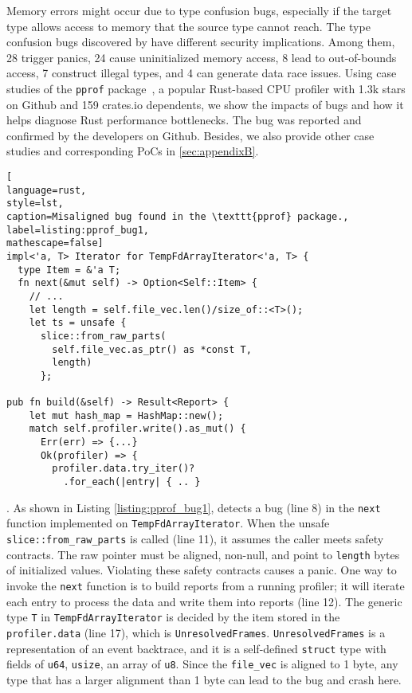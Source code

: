 {
Memory errors might occur due to type confusion bugs, especially if the target type allows access to memory that the source type cannot reach.
The type confusion bugs discovered by \TN have different security implications. 
Among them, {28} trigger panics, {24} cause uninitialized memory access, {8} lead to out-of-bounds access, {7} construct illegal types, and 4 can generate data race issues}.
%
Using case studies of the \texttt{pprof} package~\cite{pprof}, a popular Rust-based CPU profiler with 1.3k stars on Github and 159 crates.io dependents, we show the impacts of bugs and how it helps diagnose Rust performance bottlenecks. The bug was reported and confirmed by the developers on Github. 
%
Besides, we also provide other case studies and corresponding PoCs in \autoref{sec:appendixB}.



\begin{lstlisting}[
language=rust, 
style=lst,
caption=Misaligned bug found in the \texttt{pprof} package.,
label=listing:pprof_bug1,
mathescape=false]
impl<'a, T> Iterator for TempFdArrayIterator<'a, T> {
  type Item = &'a T;
  fn next(&mut self) -> Option<Self::Item> {
    // ...
    let length = self.file_vec.len()/size_of::<T>();
    let ts = unsafe {
      slice::from_raw_parts(
        self.file_vec.as_ptr() as *const T,
        length)
      };

pub fn build(&self) -> Result<Report> {
    let mut hash_map = HashMap::new();
    match self.profiler.write().as_mut() {
      Err(err) => {...}
      Ok(profiler) => {
        profiler.data.try_iter()?
          .for_each(|entry| { .. }
\end{lstlisting}


\vspace{0.05in}
.
As shown in Listing \ref{listing:pprof_bug1}, \TN detects a \bone bug (line 8) in the \texttt{next} function implemented on \texttt{TempFdArrayIterator}. 
When the unsafe \texttt{slice::from\_raw\_parts} is called (line 11), it assumes the caller meets safety contracts. The raw pointer must be aligned, non-null, and point to \texttt{length} bytes of initialized values\cite{fromrawparts}. Violating these safety contracts causes a panic. 
One way to invoke the \texttt{next} function is to build reports from a running profiler; it will iterate each entry to process the data and write them into reports (line 12). 
The generic type \texttt{T} in \texttt{TempFdArrayIterator} is decided by the item stored in the \texttt{profiler.data} (line 17), which is \texttt{UnresolvedFrames}. \texttt{UnresolvedFrames} is a representation of an event backtrace, and it is a self-defined \texttt{struct} type with fields of \texttt{u64}, \texttt{usize}, an array of \texttt{u8}. 
Since the \texttt{file\_vec} is aligned to 1 byte, any type that has a larger alignment than 1 byte can lead to the \bone bug and crash here.

